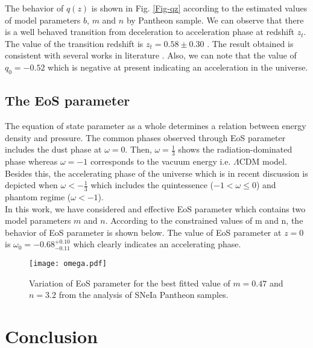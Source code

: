 The behavior of $q(z)$ is shown in Fig. \ref{Fig-qz} according to the estimated values of model parameters $b$, $m$ and $n$ by Pantheon sample. We can observe that there is a well behaved transition from deceleration to acceleration phase at redshift $z_{t}$. The value of the transition redshift is $z_{t}= 0.58\pm 0.30$ \cite{Farooq}. The result obtained is consistent with several works in literature \cite{Cunha,JV}. Also, we can note that the value of $q_{0}= -0.52$ \cite{Christine} which is negative at present indicating an acceleration in the universe.

\subsection{The EoS parameter}

The equation of state parameter as a whole determines a relation between energy density and pressure. The common phases observed through EoS parameter includes the dust phase at $\omega=0$. Then, $\omega=\frac{1}{3}$ shows the radiation-dominated phase whereas $\omega=-1$ corresponds to the vacuum energy i.e. $\Lambda$CDM model. Besides this, the accelerating phase of the universe which is in recent discussion is depicted when $\omega<-\frac{1}{3}$ which includes the quintessence ($-1<\omega\leq 0$) and phantom regime ($\omega<-1$). \\
In this work, we have considered and effective EoS parameter which contains two model parameters $m$ and $n$. 
According to the constrained values of m and n, the behavior of EoS parameter is shown below. The value of EoS parameter at $z=0$ is $\omega_{0}= -0.68^{+0.10}_{-0.11}$ \cite{Christine} which clearly indicates an accelerating phase.

\begin{figure}[H]
\centering
\texttt{[image: omega.pdf]}
\caption{Variation of EoS parameter for the best fitted value of $m=0.47$ and $n=3.2$ from the analysis of SNeIa Pantheon samples.} \label{Fig-Omega}
\end{figure}

\section{Conclusion}\label{sec6}

